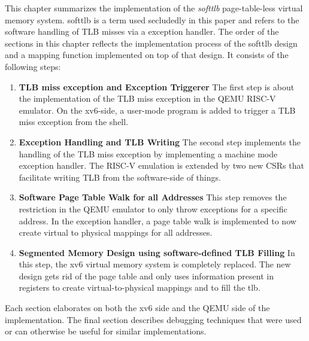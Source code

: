 This chapter summarizes the implementation of the \textit{softtlb} page-table-less virtual memory system. softtlb is a term used secludedly in this paper and refers to the software handling of TLB misses via a exception handler.
The order of the sections in this chapter reflects the implementation process of the softtlb design and a mapping function implemented on top of that design. It consists of the following steps:
\begin{enumerate}
    \item \textbf{TLB miss exception and Exception Triggerer} The first step is about
          the implementation of the TLB miss exception in the QEMU RISC-V emulator. On the xv6-side,
          a user-mode program is added to trigger a TLB miss exception from the shell.
    \item \textbf{Exception Handling and TLB Writing} The second step implements the
          handling of the TLB miss exception by implementing a machine mode exception handler.
          The RISC-V emulation is extended by two new CSRs that facilitate writing TLB from the
          software-side of things.
    \item \textbf{Software Page Table Walk for all Addresses} This step removes the restriction
          in the QEMU emulator to only throw exceptions for a specific address. In the exception handler,
          a page table walk is implemented to now create virtual to physical mappings for all addresses.
    \item \textbf{Segmented Memory Design using software-defined TLB Filling} In this step, the xv6 virtual memory system is completely
          replaced. The new design gets rid of the page table and only uses information present in
          registers to create virtual-to-physical mappings and to fill the tlb.
\end{enumerate}
Each section elaborates on both the xv6 side and the QEMU side of the implementation.
The final section describes debugging techniques that were used or can otherwise be useful for
similar implementations.

